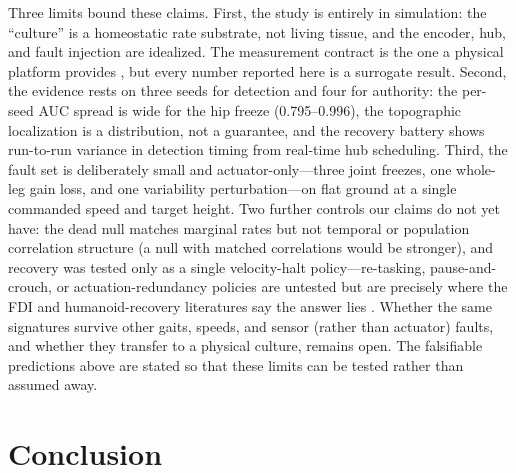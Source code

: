 Three limits bound these claims. First, the study is entirely in simulation:
the ``culture'' is a homeostatic rate substrate, not living tissue, and the
encoder, hub, and fault injection are idealized. The measurement contract is
the one a physical platform provides \cite{cai2023brainoware}, but every number
reported here is a surrogate result. Second, the evidence rests on three seeds
for detection and four for authority: the per-seed AUC spread is wide for the
hip freeze (0.795--0.996), the topographic localization is a distribution,
not a guarantee, and the recovery battery shows run-to-run variance in
detection timing from real-time hub scheduling. Third, the fault set is
deliberately small and
actuator-only---three joint freezes, one whole-leg gain loss, and one
variability perturbation---on flat ground at a single commanded speed and
target height. Two further controls our claims do not yet have: the dead null
matches marginal rates but not temporal or population correlation structure
(a null with matched correlations would be stronger), and recovery was tested
only as a single velocity-halt policy---re-tasking, pause-and-crouch, or
actuation-redundancy policies are untested but are precisely where the FDI
and humanoid-recovery literatures say the answer lies
\cite{chen1999,kajita2003,pratt2006capture,wieber2006,kuindersma2016}.
Whether the same signatures survive other gaits, speeds, and
sensor (rather than actuator) faults, and whether they transfer to a physical
culture, remains open. The falsifiable predictions above are stated so that
these limits can be tested rather than assumed away.

\section{Conclusion}

